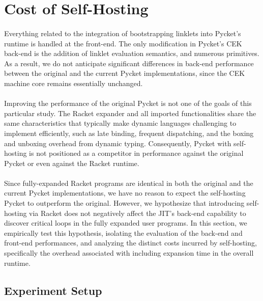 	\section[\texorpdfstring{Cost of Self-Hosting}{Cost of Self-Hosting}]{Cost of Self-Hosting}
	\label{section:cross-benchmarks}

		\paragraph{}%
			Everything related to the integration of bootstrapping linklets into Pycket's runtime is handled at the front-end. The only modification in Pycket's CEK back-end is the addition of linklet evaluation semantics, and numerous primitives. As a result, we do not anticipate significant differences in back-end performance between the original and the current Pycket implementations, since the CEK machine core remains essentially unchanged.

		\paragraph{}%
			Improving the performance of the original Pycket is not one of the goals of this particular study. The Racket expander and all imported functionalities share the same characteristics that typically make dynamic languages challenging to implement efficiently, such as late binding, frequent dispatching, and the boxing and unboxing overhead from dynamic typing. Consequently, Pycket with self-hosting is not positioned as a competitor in performance against the original Pycket or even against the Racket runtime.

		\paragraph{}%
			Since fully-expanded Racket programs are identical in both the original and the current Pycket implementations, we have no reason to expect the self-hosting Pycket to outperform the original. However, we hypothesize that introducing self-hosting via Racket does not negatively affect the JIT's back-end capability to discover critical loops in the fully expanded user programs. In this section, we empirically test this hypothesis, isolating the evaluation of the back-end and front-end performances, and analyzing the distinct costs incurred by self-hosting, specifically the overhead associated with including expansion time in the overall runtime.

		\subsection{Experiment Setup}
		\label{benchmark-setup}

